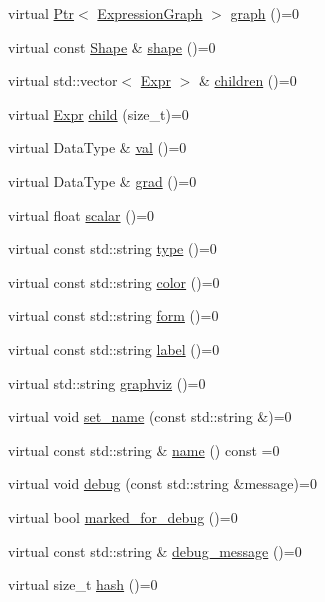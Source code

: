 \begin{DoxyCompactItemize}
\item 
virtual \hyperlink{namespacemarian_ad1a373be43a00ef9ce35666145137b08}{Ptr}$<$ \hyperlink{classmarian_1_1ExpressionGraph}{Expression\+Graph} $>$ \hyperlink{classmarian_1_1Chainable_a3e89dfd767b54ae685e9a3ec57888376}{graph} ()=0
\item 
virtual const \hyperlink{structmarian_1_1Shape}{Shape} \& \hyperlink{classmarian_1_1Chainable_aec5a801e7b0c7bc3b0d0956ced52f90b}{shape} ()=0
\item 
virtual std\+::vector$<$ \hyperlink{namespacemarian_a498d8baf75b754011078b890b39c8e12}{Expr} $>$ \& \hyperlink{classmarian_1_1Chainable_a8baafc6c50d01876b34404e033ab06ab}{children} ()=0
\item 
virtual \hyperlink{namespacemarian_a498d8baf75b754011078b890b39c8e12}{Expr} \hyperlink{classmarian_1_1Chainable_a5bd9e384a91c5aa70b33fdaa085df11b}{child} (size\+\_\+t)=0
\item 
virtual Data\+Type \& \hyperlink{classmarian_1_1Chainable_a5b4abc3fddef0cc1dea251820bf98d95}{val} ()=0
\item 
virtual Data\+Type \& \hyperlink{classmarian_1_1Chainable_a91111faa04d388d623f86a75735a65be}{grad} ()=0
\item 
virtual float \hyperlink{classmarian_1_1Chainable_a7aa762e76967be25d3f1fe73d0007890}{scalar} ()=0
\item 
virtual const std\+::string \hyperlink{classmarian_1_1Chainable_a2b7a5cbdac7a7d3bd7d781a6ff148fc3}{type} ()=0
\item 
virtual const std\+::string \hyperlink{classmarian_1_1Chainable_aabc65436f44051e63f3469c587d59803}{color} ()=0
\item 
virtual const std\+::string \hyperlink{classmarian_1_1Chainable_abe6229de0b61614d629e48fa6f1a9ca6}{form} ()=0
\item 
virtual const std\+::string \hyperlink{classmarian_1_1Chainable_a5ed3d68211003bf4f8c3185cc909d92a}{label} ()=0
\item 
virtual std\+::string \hyperlink{classmarian_1_1Chainable_a16566c8b8d4c718d8c35737f80ed45da}{graphviz} ()=0
\item 
virtual void \hyperlink{classmarian_1_1Chainable_a7d75ea224b53df6c2e1b32d86a65c359}{set\+\_\+name} (const std\+::string \&)=0
\item 
virtual const std\+::string \& \hyperlink{classmarian_1_1Chainable_a7de20b12268f18b186e2d76bfb19e899}{name} () const =0
\item 
virtual void \hyperlink{classmarian_1_1Chainable_a6cb078bf79069c097c8078b7ab8a1eb7}{debug} (const std\+::string \&message)=0
\item 
virtual bool \hyperlink{classmarian_1_1Chainable_a5b58fb9fa5f168310936ffe3fc05505a}{marked\+\_\+for\+\_\+debug} ()=0
\item 
virtual const std\+::string \& \hyperlink{classmarian_1_1Chainable_a92895c4575aefd1a67373b02cdf31472}{debug\+\_\+message} ()=0
\item 
virtual size\+\_\+t \hyperlink{classmarian_1_1Chainable_a5124cecc616150ff33fae3eff61e7372}{hash} ()=0
\end{DoxyCompactItemize}



